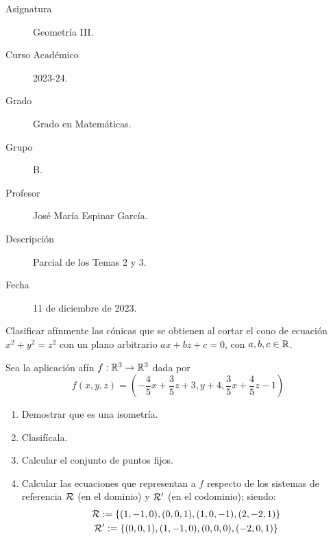 \documentclass[12pt]{article}
\begin{document}

    
    

    \begin{description}
        \item[Asignatura] Geometría III.
        \item[Curso Académico] 2023-24.
        \item[Grado] Grado en Matemáticas.
        \item[Grupo] B.
        \item[Profesor] José María Espinar García.
        \item[Descripción] Parcial de los Temas 2 y 3.
        \item[Fecha] 11 de diciembre de 2023.
    
    \end{description}
    \newpage
    
    \begin{ejercicio}[3 puntos]
        Clasificar afínmente las cónicas que se obtienen al cortar el cono de ecuación $x^2+y^2=z^2$ con un plano arbitrario  $ax+bz+c=0$, con $a,b,c\in \mathbb{R}$.
    \end{ejercicio}

    \begin{ejercicio}[4 puntos]
        Sea la aplicación afín $f:\mathbb{R}^3\to \mathbb{R}^3$ dada por
        \begin{equation*}
            f(x,y,z)=\left(-\frac{4}{5}x + \frac{3}{5}z + 3, y+4,\frac{3}{5}x + \frac{4}{5}z-1\right)
        \end{equation*}
        \begin{enumerate}
            \item Demostrar que es una isometría.
            \item Clasifícala.
            \item Calcular el conjunto de puntos fijos.
            \item Calcular las ecuaciones que representan a $f$ respecto de los sistemas de referencia $\mathcal{R}$ (en el dominio) y $\mathcal{R}'$ (en el codominio); siendo:
            \begin{gather*}
                \mathcal{R}:=\{(1,-1,0), (0,0,1), (1,0,-1), (2,-2,1)\}\\
                \mathcal{R}':=\{(0,0,1), (1,-1,0), (0,0,0), (-2,0,1)\}
            \end{gather*}
        \end{enumerate}
    \end{ejercicio}
\end{document}

